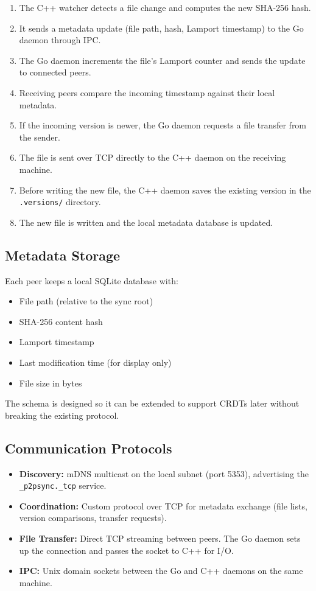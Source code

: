 \begin{enumerate}
    \item The C++ watcher detects a file change and computes the new SHA-256 hash.
    \item It sends a metadata update (file path, hash, Lamport timestamp) to the Go daemon through IPC.
    \item The Go daemon increments the file's Lamport counter and sends the update to connected peers.
    \item Receiving peers compare the incoming timestamp against their local metadata.
    \item If the incoming version is newer, the Go daemon requests a file transfer from the sender.
    \item The file is sent over TCP directly to the C++ daemon on the receiving machine.
    \item Before writing the new file, the C++ daemon saves the existing version in the \texttt{.versions/} directory.
    \item The new file is written and the local metadata database is updated.
\end{enumerate}

\subsection{Metadata Storage}

Each peer keeps a local SQLite database with:
\begin{itemize}
    \item File path (relative to the sync root)
    \item SHA-256 content hash
    \item Lamport timestamp
    \item Last modification time (for display only)
    \item File size in bytes
\end{itemize}

The schema is designed so it can be extended to support CRDTs later without breaking the existing protocol.

\subsection{Communication Protocols}

\begin{itemize}
    \item \textbf{Discovery:} mDNS multicast on the local subnet (port 5353), advertising the \texttt{\_p2psync.\_tcp} service.
    \item \textbf{Coordination:} Custom protocol over TCP for metadata exchange (file lists, version comparisons, transfer requests).
    \item \textbf{File Transfer:} Direct TCP streaming between peers. The Go daemon sets up the connection and passes the socket to C++ for I/O.
    \item \textbf{IPC:} Unix domain sockets between the Go and C++ daemons on the same machine.
\end{itemize}

